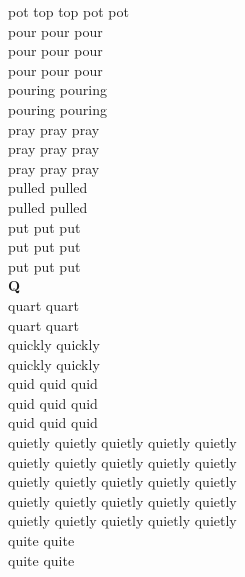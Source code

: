 pot top top pot pot\\
pour pour pour\\
pour pour pour\\
pour pour pour\\
pouring pouring\\
pouring pouring\\
pray pray pray\\
pray pray pray\\
pray pray pray\\
pulled pulled\\
pulled pulled\\
put put put\\
put put put\\
put put put\\


\vspace{14pt}
\noindent\textbf{\Large Q}\\[+12pt]
quart quart\\
quart quart\\
quickly quickly\\
quickly quickly\\
quid quid quid\\
quid quid quid\\
quid quid quid\\
quietly quietly quietly quietly quietly\\
quietly quietly quietly quietly quietly\\
quietly quietly quietly quietly quietly\\
quietly quietly quietly quietly quietly\\
quietly quietly quietly quietly quietly\\
quite quite\\
quite quite\\


